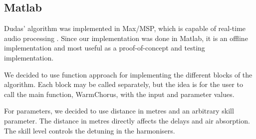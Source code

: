 \subsection{Matlab}
Dudas' algorithm was implemented in Max/MSP, which is capable of real-time audio processing \cite{dudas}. Since our implementation was done in Matlab, it is an offline implementation and most useful as a proof-of-concept and testing implementation.

We decided to use function approach for implementing the different blocks of the algorithm. Each block may be called separately, but the idea is for the user to call the main function, WarmChorus, with the input and parameter values.

For parameters, we decided to use distance in metres and an arbitrary skill parameter. The distance in metres directly affects the delays and air absorption. The skill level controls the detuning in the harmonisers.
